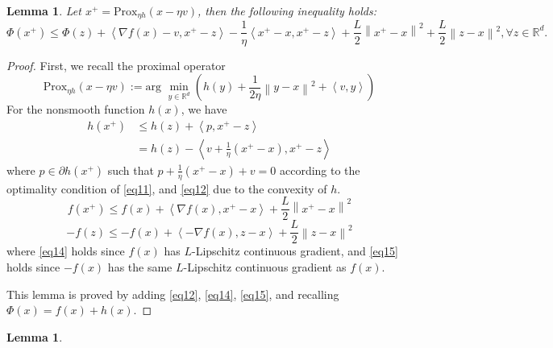 \documentclass{article}
\newcommand*{\R}{\mathbb{R}}
\newcommand*{\Po}{\text{Prox}}
\newcommand{\norm}[1]{\left\lVert#1\right\rVert}
\newcommand{\Iprod}[2]{\left\langle #1,#2\right\rangle}
\newtheorem{lemma}[theorem]{Lemma}
\theoremstyle{definition}
\theoremstyle{remark}
\begin{document}
\begin{lemma}\label{lemma1}
Let $x^+ = \Po_{\eta h}(x-\eta v)$, then the following inequality holds:
\begin{equation}\label{eq10}
\Phi(x^+) \leq \Phi(z) + \Iprod{\nabla f(x)-v}{x^+-z}-\frac{1}{\eta} \Iprod{x^+-x}{x^+-z}+\frac{L}{2}\norm{x^+-x}^2+\frac{L}{2}\norm{z-x}^2, \forall z\in \R^d. 
\end{equation}
\end{lemma}
\begin{proof}
First, we recall the proximal operator 
\begin{equation}\label{eq11}
\Po_{\eta h}(x-\eta v) := \text{arg}\,\,\min_{y\in\R^d}\left(h(y)+\frac{1}{2\eta}\norm{y-x}^2+\Iprod{v}{y}\right)
\end{equation}
For the nonsmooth function $h(x)$, we have 
\begin{equation}\label{eq12}
\begin{split}
h(x^+) &\leq h(z) + \Iprod{p}{x^+-z}\\
&= h(z) - \Iprod{v+\frac{1}{\eta}(x^+-x)}{x^+-z}
\end{split}
\end{equation}
where $p\in \partial h(x^+)$ such that $p+\frac{1}{\eta}(x^+-x)+v = 0$ according to the optimality condition of \eqref{eq11}, and \eqref{eq12} due to the convexity of $h$.
\begin{equation}\label{eq14}
f(x^+) \leq f(x)+\Iprod{\nabla f(x)}{x^+-x}+\frac{L}{2}\norm{x^+-x}^2
\end{equation}
\begin{equation}\label{eq15}
-f(z) \leq -f(x)+\Iprod{-\nabla f(x)}{z-x}+\frac{L}{2}\norm{z-x}^2
\end{equation}
where \eqref{eq14} holds since $f(x)$ has $L$-Lipschitz continuous gradient, and \eqref{eq15} holds since $-f(x)$ has the same $L$-Lipschitz continuous gradient as $f(x)$. 

 This lemma is proved by adding \eqref{eq12}, \eqref{eq14}, \eqref{eq15}, and recalling $\Phi(x) = f(x)+h(x)$. 
\end{proof}
\begin{lemma}
\end{lemma}
\end{document}

